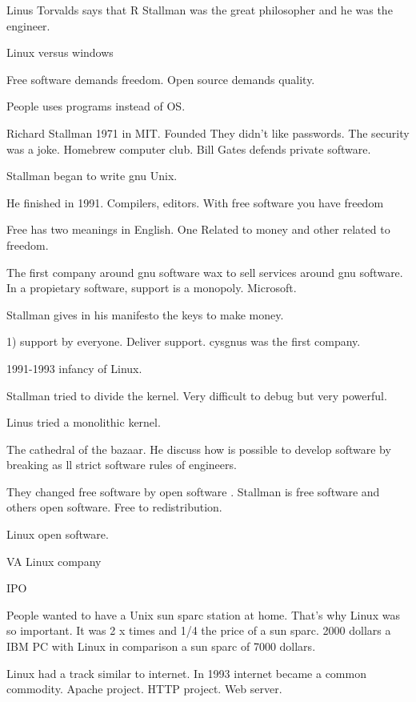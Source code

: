   Linus Torvalds says that R Stallman was the great philosopher and he was the engineer. 
  
  
  
  
  
  Linux versus windows
  
  
  Free software demands freedom. 
  Open source demands quality. 
  
  People uses programs instead of OS. 
  
  Richard Stallman 
  1971 in MIT. Founded 
  They didn't like passwords. 
  The security was a joke. 
  Homebrew computer club. 
  Bill Gates defends private software. 
  
  Stallman  began to write gnu Unix. 
  
  He finished in 1991. 
  Compilers, editors. 
  With free software you have freedom 
  
  Free has two meanings in English. One 
  Related to money and other related to freedom. 
  
  
  The first company around gnu software wax to sell services around gnu software. In a propietary software, support is a monopoly. Microsoft. 
  
  
  Stallman gives in his manifesto the keys to make money. 
  
  1) support by everyone. Deliver support. 
  cysgnus was the first company. 
  
  1991-1993 infancy of Linux. 
  
  Stallman tried to divide the kernel. Very difficult to debug but very powerful. 
  
  Linus tried a monolithic kernel. 
  
  
  
  The cathedral of the bazaar. He discuss how is possible to develop software by breaking as ll strict software rules of engineers.  
  
  
  They changed free software by open software .
  Stallman is free software and others open software. Free to redistribution. 
  
  Linux open software.
  
  VA Linux company 
  
  IPO 
  
  People wanted to have a Unix sun sparc station at home. That's why Linux was so important.
  It was 2 x times and 1/4 the price of a sun sparc. 
  2000 dollars a IBM PC with Linux in comparison a sun sparc of 7000 dollars. 
  
  Linux had a track similar to internet. In 1993 internet became a common commodity. 
  Apache project. HTTP project. Web server. 
  
